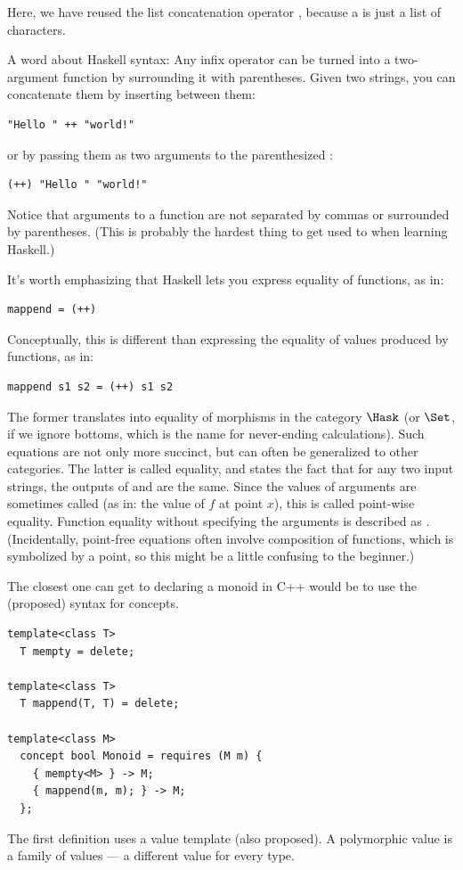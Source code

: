Here, we have reused the list concatenation operator \code{(++)},
because a  is just a list of characters.

A word about Haskell syntax: Any infix operator can be turned into a
two-argument function by surrounding it with parentheses. Given two
strings, you can concatenate them by inserting \code{++} between them:

\begin{Verbatim}
"Hello " ++ "world!"
\end{Verbatim}
or by passing them as two arguments to the parenthesized \code{(++)}:

\begin{Verbatim}
(++) "Hello " "world!"
\end{Verbatim}
Notice that arguments to a function are not separated by commas or
surrounded by parentheses. (This is probably the hardest thing to get
used to when learning Haskell.)

It's worth emphasizing that Haskell lets you express equality of
functions, as in:

\begin{Verbatim}
mappend = (++)
\end{Verbatim}
Conceptually, this is different than expressing the equality of values
produced by functions, as in:

\begin{Verbatim}
mappend s1 s2 = (++) s1 s2
\end{Verbatim}
The former translates into equality of morphisms in the category
$\Hask$ (or $\Set$, if we ignore bottoms, which is the name
for never-ending calculations). Such equations are not only more
succinct, but can often be generalized to other categories. The latter
is called  equality, and states the fact that for any
two input strings, the outputs of  and \code{(++)} are
the same. Since the values of arguments are sometimes called
 (as in: the value of $f$ at point $x$), this is called
point-wise equality. Function equality without specifying the arguments
is described as . (Incidentally, point-free equations
often involve composition of functions, which is symbolized by a point,
so this might be a little confusing to the beginner.)

The closest one can get to declaring a monoid in C++ would be to use the
(proposed) syntax for concepts.

\begin{Verbatim}
template<class T>
  T mempty = delete;
  
template<class T>
  T mappend(T, T) = delete;
  
template<class M> 
  concept bool Monoid = requires (M m) { 
    { mempty<M> } -> M; 
    { mappend(m, m); } -> M;
  };
\end{Verbatim}
The first definition uses a value template (also proposed). A
polymorphic value is a family of values --- a different value for every
type.

